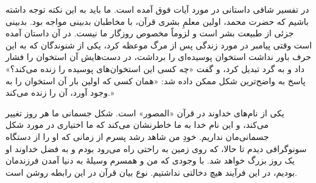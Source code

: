 در تفسیر شافی
داستانی در مورد آیات فوق آمده است. ما باید به این نکته توجه داشته باشیم که حضرت محمد{}، اولین معلمِ بشری قرآن، با مخاطبان بدبینی مواجه بود. بدبینی جزئی از طبیعت بشر است و لزوماً مخصوص روزگار ما نیست. در آن داستان آمده است وقتی پیامبر{} در مورد زندگی پس از مرگ موعظه کرد، یکی از شنوندگان که به این حرف باور نداشت استخوان پوسیده‌ای را برداشت، در دست‌هایش آن استخوان را فشار داد و به گرد تبدیل کرد، و گفت «چه کسی این استخوان‌های پوسیده را زنده می‌کند؟» پاسخ به واضح‌ترین شکل ممکن داده شد: «همان کسی که اولین بار آن استخوان را به وجود آورد، آن را زنده می‌کند.»

یکی از نام‌های خداوند در قرآن  «المصور» است. شکل جسمانی ما هر روز تغییر می‌کند، و این نام خدا به ما خاطرنشان می‌کند که ما اختیاری در مورد شکل جسمانی‌مان نداریم. خودِ من شاهد رشد پسرم  از زمانی که او را از دستگاه سونوگرافی دیدم تا حالا، که روی زمین به راحتی راه می‌رود بودم و به فضل خداوند او  یک روز بزرگ خواهد شد. با وجودی که من و همسرم وسیلهٔ به دنیا آمدن فرزندمان بودیم، در این فرآیند هیچ دخالتی نداشتیم. نوع بیان قرآن در این رابطه روشن است.

